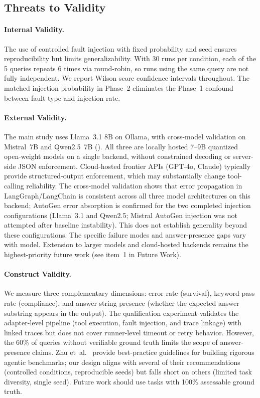 \documentclass[make,article,submit,moreauthors,pdftex]{mdpi}
\begin{document}
\subsection{Threats to Validity}

\paragraph{Internal Validity.} {The use of controlled fault injection with fixed probability and seed ensures reproducibility but limits generalizability. With 30 runs per condition, each of the 5 queries repeats 6 times via round-robin, so runs using the same query are not fully independent. We report Wilson score confidence intervals throughout. The matched injection probability in Phase~2 eliminates the Phase~1 confound between fault type and injection rate.}

\paragraph{External Validity.} {The main study uses Llama~3.1 8B on Ollama, with cross-model validation on Mistral~7B and Qwen2.5~7B (). All three are locally hosted 7--9B quantized open-weight models on a single backend, without constrained decoding or server-side JSON enforcement. Cloud-hosted frontier APIs (GPT-4o, Claude) typically provide structured-output enforcement, which may substantially change tool-calling reliability. The cross-model validation shows that error propagation in LangGraph/LangChain is consistent across all three model architectures on this backend; AutoGen error absorption is confirmed for the two completed injection configurations (Llama~3.1 and Qwen2.5; Mistral AutoGen injection was not attempted after baseline instability). This does not establish generality beyond these configurations. The specific failure modes and answer-presence gaps vary with model. Extension to larger models and cloud-hosted backends remains the highest-priority future work (see item~1 in Future Work).}

\paragraph{Construct Validity.} {We measure three complementary dimensions: error rate (survival), keyword pass rate (compliance), and answer-string presence (whether the expected answer substring appears in the output). The qualification experiment validates the adapter-level pipeline (tool execution, fault injection, and trace linkage) with linked traces but does not cover runner-level timeout or retry behavior. However, the 60\% of queries without verifiable ground truth limits the scope of answer-presence claims. Zhu et~al.~\cite{zhu2025benchmarking} provide best-practice guidelines for building rigorous agentic benchmarks; our design aligns with several of their recommendations (controlled conditions, reproducible seeds) but falls short on others (limited task diversity, single seed). Future work should use tasks with 100\% assessable ground truth.}
\end{document}
